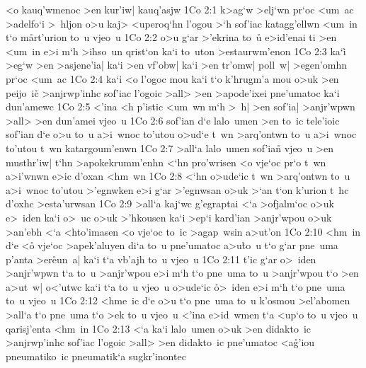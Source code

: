 <o
kauq'wmenoc
>en
kur'iw|
kauq'asjw\bibvsend
\vs 1Co 2:1
k>ag`w
>elj`wn
pr`oc
<um~ac
>adelfo`i
>~hljon
o>u
kaj>
<uperoq`hn
l'ogou
>`h
sof'iac
katagg'ellwn
<um~in
t`o
m\r{a}rt'urion
to~u
vjeo~u\bibvsend
\vs 1Co 2:2
o>u
g`ar
>'ekrina
to~u\r{}
e>id'enai
ti
>en
<um~in
e>i
m`h
>ihso~un
qrist`on
ka`i
to~uton
>estaurwm'enon\bibvsend
\vs 1Co 2:3
ka`i\r{}
>eg`w
>en
>asjene'ia|
ka`i
>en
vf'obw|
ka`i
>en
tr'omw|
poll~w|
>egen'omhn
pr`oc
<um~ac\bibvsend
\vs 1Co 2:4
ka`i
<o
l'ogoc
mou
ka`i
t`o
k'hrugm'a
mou
o>uk
>en
peijo~ic\r{}
>anjrwp'inhc
sof'iac
l'ogoic
>all>
>en
>apode'ixei
pne'umatoc
ka`i
dun'amewc\bibvsend
\vs 1Co 2:5
<'ina
<h
p'istic
<um~wn
m`h
>~h|
>en
sof'ia|
>anjr'wpwn
>all>
>en
dun'amei
vjeo~u\bibvsend
\vs 1Co 2:6
sof'ian
d`e
lalo~umen
>en
to~ic
tele'ioic
sof'ian
d`e
o>u
to~u
a>i~wnoc
to'utou
o>ud`e
t~wn
>arq'ontwn
to~u
a>i~wnoc
to'utou
t~wn
katargoum'enwn\bibvsend
\vs 1Co 2:7
>all`a
lalo~umen
sof'ian\r{}
vjeo~u
>en
musthr'iw|
t`hn
>apokekrumm'enhn
<`hn
pro'wrisen
<o
vje`oc
pr`o
t~wn
a>i'wnwn
e>ic
d'oxan
<hm~wn\bibvsend
\vs 1Co 2:8
<`hn
o>ude`ic
t~wn
>arq'ontwn
to~u
a>i~wnoc
to'utou
>'egnwken
e>i
g`ar
>'egnwsan
o>uk
>`an
t`on
k'urion
t~hc
d'oxhc
>esta'urwsan\bibvsend
\vs 1Co 2:9
>all`a
kaj`wc
g'egraptai
<`a
>ofjalm`oc
o>uk
e>~iden
ka`i
o>~uc
o>uk
>'hkousen
ka`i
>ep`i
kard'ian
>anjr'wpou
o>uk
>an'ebh
<`a
<hto'imasen
<o
vje`oc
to~ic
>agap~wsin
a>ut'on\bibvsend
\vs 1Co 2:10
<hm~in
d`e
<o\r{}
vje`oc
>apek'aluyen
di`a
to~u
pne'umatoc
a>u\r{t}o~u
t`o
g`ar
pne~uma
p'anta
>er\r{e}un~a|
ka`i
t`a
vb'ajh
to~u
vjeo~u\bibvsend
\vs 1Co 2:11
t'ic
g`ar
o>~iden
>anjr'wpwn
t`a
to~u
>anjr'wpou
e>i
m`h
t`o
pne~uma
to~u
>anjr'wpou
t`o
>en
a>ut~w|
o<'utwc
ka`i
t`a
to~u
vjeo~u
o>ude`ic
\r{o}>~iden
e>i
m`h
t`o
pne~uma
to~u
vjeo~u\bibvsend
\vs 1Co 2:12
<hme~ic
d`e
o>u
t`o
pne~uma
to~u
k'osmou
>el'abomen
>all`a
t`o
pne~uma
t`o
>ek
to~u
vjeo~u
<'ina
e>id~wmen
t`a
<up`o
to~u
vjeo~u
qarisj'enta
<hm~in\bibvsend
\vs 1Co 2:13
<`a
ka`i
lalo~umen
o>uk
>en
didakto~ic
>anjrwp'inhc
sof'iac
l'ogoic
>all>
>en
didakto~ic
pne'umatoc
<a\r{g}'iou
pneumatiko~ic
pneumatik`a
sugkr'inontec\bibvsend
